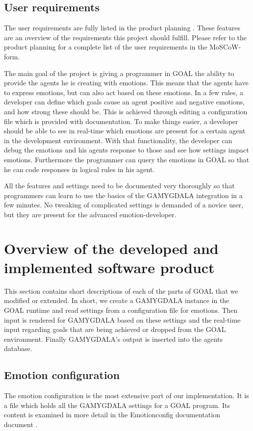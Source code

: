 \documentclass[11pt]{article}
\begin{document}
\subsection{User requirements}
The user requirements are fully listed in the product planning \cite{productplan}. These features are an overview of the requirements this project should fulfill. Please refer to the product planning for a complete list of the user requirements in the \gls{MoSCoW}-form.\cite{MoSCoW}\par
The main goal of the project is giving a programmer in GOAL the ability to provide the agents he is creating with emotions. This means that the agents have to express emotions, but can also act based on these emotions. In a few rules, a developer can define which goals cause an agent positive and negative emotions, and how strong these should be. This is achieved through editing a configuration file which is provided with documentation. To make things easier, a developer should be able to see in real-time which emotions are present for a certain agent in the development environment. With that functionality, the developer can debug the emotions and his agents response to those and see how settings impact emotions. Furthermore the programmer can query the emotions in GOAL so that he can code responses in logical rules in his agent. \par All the features and settings need to be documented very thoroughly so that programmers can learn to use the basics of the GAMYGDALA integration in a few minutes. No tweaking of complicated settings is demanded of a novice user, but they are present for the advanced emotion-developer.


\section{Overview of the developed and implemented software product}
This section contains short descriptions of each of the parts of GOAL\cite{GOAL Env} that we modified or extended. In short, we create a GAMYGDALA instance in the GOAL runtime and read settings from a configuration file for emotions. Then input is rendered for GAMYGDALA based on these settings and the real-time input regarding goals that are being achieved or dropped from the GOAL environment. Finally GAMYGDALA's output is inserted into the agents database.

\subsection{Emotion configuration}
The emotion configuration\cite{emotionconfig} is the most extensive part of our implementation. It is a file which holds all the GAMYGDALA settings for a GOAL program. Its content is examined in more detail in the Emotionconfig documentation document \cite{emotionconfig}.
\end{document}
